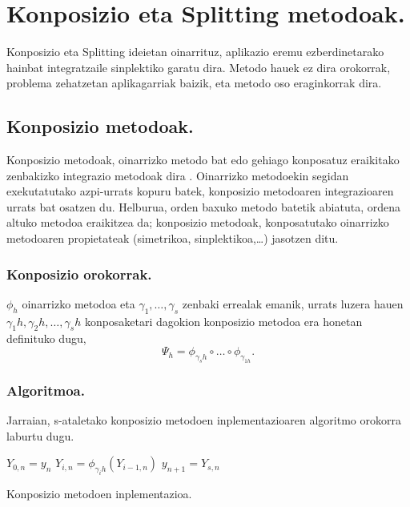 \section{Konposizio eta Splitting metodoak.}

Konposizio eta Splitting ideietan oinarrituz, aplikazio eremu ezberdinetarako hainbat integratzaile sinplektiko \cite{SSerna2015b} garatu dira. Metodo hauek ez dira orokorrak, problema zehatzetan aplikagarriak baizik, eta metodo oso eraginkorrak dira.

\subsection{Konposizio metodoak.}

Konposizio metodoak, oinarrizko metodo bat edo gehiago konposatuz eraikitako zenbakizko integrazio metodoak dira \cite{Hairer2006}.  Oinarrizko metodoekin segidan exekutatutako azpi-urrats kopuru batek, konposizio metodoaren integrazioaren urrats bat osatzen du. Helburua, orden baxuko metodo batetik abiatuta, ordena altuko metodoa eraikitzea da; konposizio metodoak, konposatutako oinarrizko metodoaren propietateak (simetrikoa, sinplektikoa,\dots) jasotzen ditu. 

\subsubsection*{Konposizio orokorrak.}
$\phi_h$ oinarrizko metodoa eta $\gamma_1,\dots,\gamma_s$ zenbaki errealak emanik, urrats luzera hauen $\gamma_1 h,\gamma_2 h,\dots,\gamma_s h$ konposaketari dagokion konposizio metodoa era honetan definituko dugu,
\begin{equation}
\Psi_h=\phi_{\gamma_s h} \circ \dots \circ \phi_{\gamma_{1 h}}.
\end{equation}

\subsubsection*{Algoritmoa.}
Jarraian, s-ataletako konposizio metodoen inplementazioaren algoritmo orokorra laburtu dugu.

\begin{algorithm}[H]
 \BlankLine
  {
   \BlankLine
    $Y_{0,n}=y_{n} $\;
    \BlankLine
   {
    \BlankLine 
    $Y_{i,n}=\phi_{\gamma_i h}(Y_{i-1,n})$\;
   }
   \BlankLine
    $y_{n+1}=Y_{s,n}$\;
   \BlankLine
 }
 \caption{Konposizio metodoen inplementazioa.}
 \label{alg:konp}
\end{algorithm}
 
